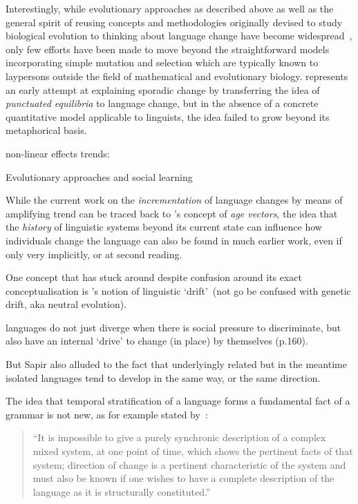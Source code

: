Interestingly, while evolutionary approaches as described above as well as the general spirit of reusing concepts and methodologies originally devised to study biological evolution to thinking about language change have become widespread~\citep{Atkinson2005}, only few efforts have been made to move beyond the straightforward models incorporating simple mutation and selection which are typically known to laypersons outside the field of mathematical and evolutionary biology.
\citet{Dixon1997} represents an early attempt at explaining sporadic change by transferring the idea of \emph{punctuated equilibria} to language change, but in the absence of a concrete quantitative model applicable to linguists, the idea failed to grow beyond its metaphorical basis.

non-linear effects
trends: \citep{Bikhchandani1992,Bikhchandani1998}

Evolutionary approaches and social learning

\citep{Altmann2013,Acerbi2014}

While the current work on the \emph{incrementation} of language changes by means of amplifying trend can be traced back to \citet[ch.14]{Labov2001}'s concept of \emph{age vectors}, the idea that the \emph{history} of linguistic systems beyond its current state can influence how individuals change the language can also be found in much earlier work, even if only very implicitly, or at second reading.

One concept that has stuck around despite confusion around its exact conceptualisation %
is \citet{Sapir1921}'s notion of linguistic `drift'~(not go be confused with genetic drift, aka neutral evolution). 

 languages do not just diverge when there is social pressure to discriminate, but also have an internal `drive' to change (in place) by themselves (p.160).

But Sapir also alluded to the fact that underlyingly related but in the meantime isolated languages tend to develop in the same way, or the same direction. 

The idea that temporal stratification of a language forms a fundamental fact of a grammar is not new, as for example stated by~\citet[p.42]{Fries1949}:
\begin{quote}
``It is impossible to give a purely synchronic description of a complex mixed system, at one point of time, which shows the pertinent facts of that system; direction of change is a pertinent characteristic of the system and must also be known if one wishes to have a complete description of the language as it is structurally constituted.''
\end{quote}

